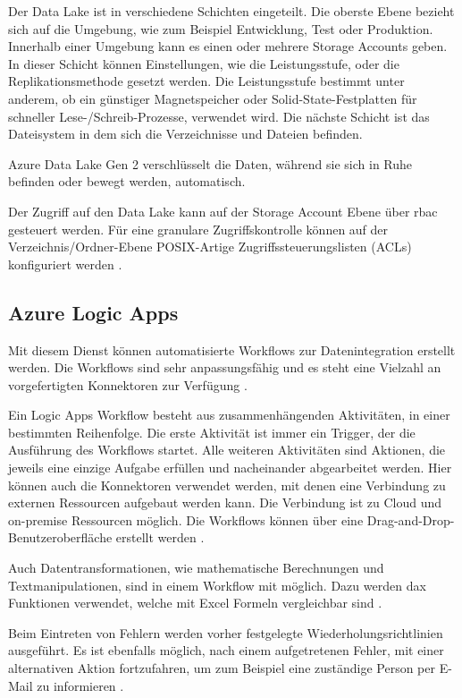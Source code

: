 Der Data Lake ist in verschiedene Schichten eingeteilt. Die oberste Ebene bezieht sich auf die Umgebung, wie zum Beispiel Entwicklung, Test oder Produktion. Innerhalb einer Umgebung kann es einen oder mehrere Storage Accounts geben. In dieser Schicht können Einstellungen, wie die Leistungsstufe, oder die Replikationsmethode gesetzt werden. Die Leistungsstufe bestimmt unter anderem, ob ein günstiger Magnetspeicher oder Solid-State-Festplatten für schneller Lese-/Schreib-Prozesse, verwendet wird. Die nächste Schicht ist das Dateisystem in dem sich die Verzeichnisse und Dateien befinden.

Azure Data Lake Gen 2 verschlüsselt die Daten, während sie sich in Ruhe befinden oder bewegt werden, automatisch.

Der Zugriff auf den Data Lake kann auf der Storage Account Ebene über \ac{rbac} gesteuert werden. Für eine granulare Zugriffskontrolle können auf der Verzeichnis/Ordner-Ebene POSIX-Artige Zugriffssteuerungslisten (ACLs) konfiguriert werden \cite{lesteve_definitive_2021}.

\subsection{Azure Logic Apps} \label{sec:grundlagen:azure_dienste:logicApps}
Mit diesem Dienst können automatisierte Workflows zur Datenintegration erstellt werden. Die Workflows sind sehr anpassungsfähig und es steht eine Vielzahl an vorgefertigten Konnektoren zur Verfügung \cite{kumar_serverless_2019}.

Ein Logic Apps Workflow besteht aus zusammenhängenden Aktivitäten, in einer bestimmten Reihenfolge. Die erste Aktivität ist immer ein Trigger, der die Ausführung des Workflows startet. Alle weiteren Aktivitäten sind Aktionen, die jeweils eine einzige Aufgabe erfüllen und nacheinander abgearbeitet werden. Hier können auch die Konnektoren verwendet werden, mit denen eine Verbindung zu externen Ressourcen aufgebaut werden kann. Die Verbindung ist zu Cloud und on-premise Ressourcen möglich. Die Workflows können über eine Drag-and-Drop-Benutzeroberfläche erstellt werden \cite{modi_azure_2020}.

Auch Datentransformationen, wie mathematische Berechnungen und Textmanipulationen, sind in einem Workflow mit möglich. Dazu werden \ac{dax} Funktionen verwendet, welche mit Excel Formeln vergleichbar sind \cite{bennett_enterprise_2021}.

Beim Eintreten von Fehlern werden vorher festgelegte Wiederholungsrichtlinien ausgeführt. Es ist ebenfalls möglich, nach einem aufgetretenen Fehler, mit einer alternativen Aktion fortzufahren, um zum Beispiel eine zuständige Person per E-Mail zu informieren \cite{fan_handle_2021}.

